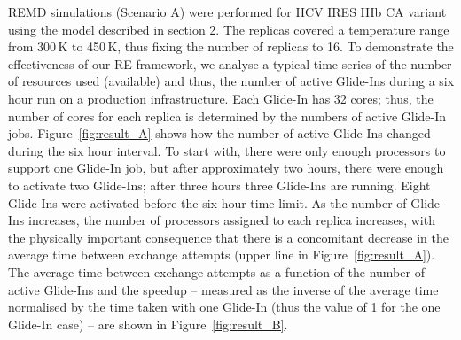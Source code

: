 \documentclass{rspublic}
\begin{document}
REMD simulations (Scenario A) were performed for HCV IRES IIIb CA
variant using the model described in section 2. The replicas covered a
temperature range from 300\,K to 450\,K, thus fixing the number of
replicas to 16.  To demonstrate the effectiveness of our RE framework,
we analyse a typical time-series of the number of resources used
(available) and thus, the number of active Glide-Ins during a six hour
run on a production infrastructure.  Each Glide-In has 32 cores; 
thus, the number of cores for each replica is determined by the numbers of
active Glide-In jobs.  Figure~\ref{fig:result_A} shows how the number
of active Glide-Ins changed during the six hour interval. To start
with, there were only enough processors to support one Glide-In job,
but after approximately two hours, there were enough to activate two
Glide-Ins; after three hours three Glide-Ins are running. 
Eight Glide-Ins were activated before the six hour time
limit. As the number of Glide-Ins increases, the number of processors
assigned to each replica increases, with the physically important
consequence that there is a concomitant decrease in the average time
between exchange attempts (upper line in Figure~\ref{fig:result_A}).
The average time between exchange attempts as a function of the number
of active Glide-Ins and
the speedup -- measured as the inverse of the average time
normalised by the time taken with one Glide-In (thus the value of 1
for the one Glide-In case)  -- are shown in Figure~\ref{fig:result_B}.
\end{document}
